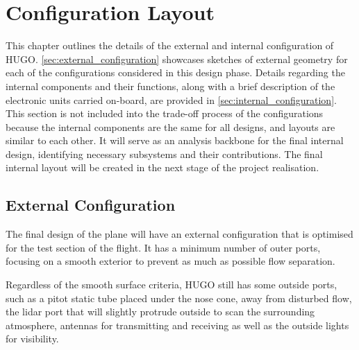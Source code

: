\chapter{Configuration Layout}
\label{ch:configuration_layout}
This chapter outlines the details of the external and internal configuration of HUGO. \autoref{sec:external_configuration} showcases sketches of external geometry for each of the configurations considered in this design phase. Details regarding the internal components and their functions, along with a brief description of the electronic units carried on-board, are provided in \autoref{sec:internal_configuration}.
This section is not included into the trade-off process of the configurations because the internal components are the same for all designs, and layouts are similar to each other. It will serve as an analysis backbone for the final internal design, identifying necessary subsystems and their contributions. The final internal layout will be created in the next stage of the project realisation.

\section{External Configuration}
\label{sec:external_configuration}
The final design of the plane will have an external configuration that is optimised for the test section of the flight. It has a minimum number of outer ports, focusing on a smooth exterior to prevent as much as possible flow separation. 

Regardless of the smooth surface criteria, HUGO still has some outside ports, such as a pitot static tube placed under the nose cone, away from disturbed flow, the lidar port that will slightly protrude outside to scan the surrounding atmosphere, antennas for transmitting and receiving as well as the outside lights for visibility. 

